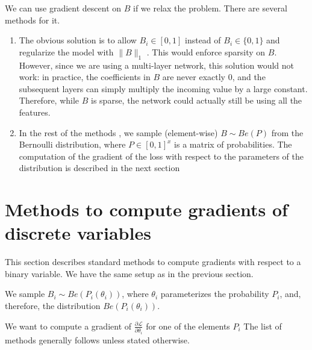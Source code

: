 \documentclass[a4paper,11pt,oneside]{report}
\begin{document}
We can use gradient descent on $B$ if we relax the problem. There are several methods for it.
\begin{enumerate}
    \item The obvious solution is to allow $B_i\in[0,1]$ instead of $B_i\in\{0,1\}$ and regularize the model with $\|B\|_1$ \cite{Tank2017}. This would enforce sparsity on $B$. However, since we are using a multi-layer network, this solution would not work: in practice, the coefficients in $B$ are never exactly $0$, and the subsequent layers can simply multiply the incoming value by a large constant. Therefore, while $B$ is sparse, the network could actually still be using all the features.
    \item In the rest of the methods \cite{Ng2019,Abid2019,Lamb2020,Kalainathan,Yang2020}, we sample (element-wise) $B\sim Be(P)$ from the Bernoulli distribution, where $P\in[0,1]^x$ is a matrix of probabilities. The computation of the gradient of the loss with respect to the parameters of the distribution is described in the next section
\end{enumerate}

\section{Methods to compute gradients of discrete variables}
\label{sec:grad_discrete}
This section describes standard methods to compute gradients with respect to a binary variable. We have the same setup as in the previous section.

We sample $B_i\sim Be(P_i(\theta_i))$, where $\theta_i$ parameterizes the probability $P_i$, and, therefore, the distribution $Be(P_i(\theta_i))$.

We want to compute a gradient of $\frac{\partial \mathcal L}{\partial \theta_i}$ for one of the elements $P_i$ The list of methods generally follows \cite{Bengio2013, Weib2011,Maddison2017} unless stated otherwise.
\end{document}

